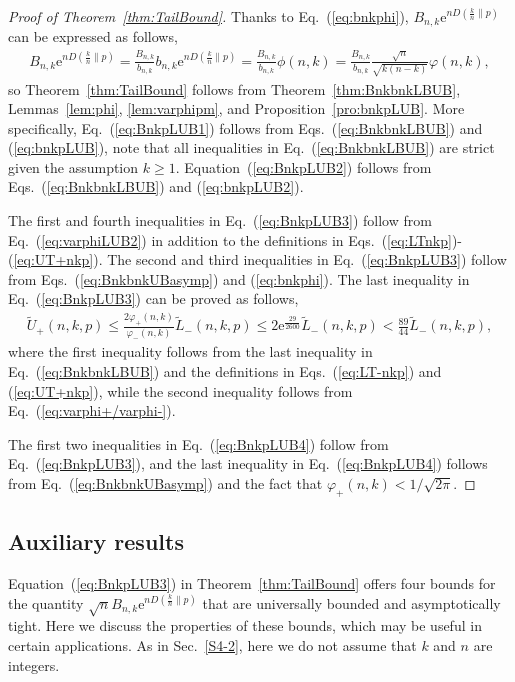 \documentclass[aop]{imsart}
\theoremstyle{plain}
\theoremstyle{remark}
\newcommand{\rme}{\mathrm{e}}
\newcommand{\1}{\operatorname{\uppercase\expandafter{\romannumeral1}}}
\newcommand{\2}{\operatorname{\uppercase\expandafter{\romannumeral2}}}
\newcommand{\3}{\operatorname{\uppercase\expandafter{\romannumeral3}}}
\newcommand{\4}{\operatorname{\uppercase\expandafter{\romannumeral4}}}
\newcommand{\5}{\operatorname{\uppercase\expandafter{\romannumeral5}}}
\newcommand{\6}{\operatorname{\uppercase\expandafter{\romannumeral6}}}
\newcommand{\7}{\operatorname{\uppercase\expandafter{\romannumeral7}}}
\newcommand{\8}{\operatorname{\uppercase\expandafter{\romannumeral8}}}
\newcommand{\9}{\operatorname{\uppercase\expandafter{\romannumeral9}}}
\def\eqref#1{\textup{(\ref{#1})}}
\newcommand{\eref}[1]{Eq.~\textup{(\ref{#1})}}
\newcommand{\Eref}[1]{Equation~\textup{(\ref{#1})}}
\newcommand{\eqsref}[2]{Eqs.~(\ref{#1}) and (\ref{#2})}
\newcommand{\thref}[1]{Theorem~\ref{#1}}
\newcommand{\lsref}[1]{Lemmas~\ref{#1}}
\newcommand{\pref}[1]{Proposition~\ref{#1}}
\newcommand{\sref}[1]{Sec.~\ref{#1}}
\begin{document}
\begin{proof}[Proof of \thref{thm:TailBound}]
Thanks to \eref{eq:bnkphi},
	$B_{n,k}\rme^{nD(\frac{k}{n}\| p)}$ can be expressed as follows,
	\begin{gather}\label{eq:BnkRE}
	B_{n,k}\rme^{nD(\frac{k}{n}\| p)}=\frac{B_{n,k}}{b_{n,k}}b_{n,k}\rme^{nD(\frac{k}{n}\| p)}=\frac{B_{n,k}}{b_{n,k}}\phi(n,k)=\frac{B_{n,k}}{b_{n,k}}\frac{\sqrt{n}}{\sqrt{ k(n-k)}} \varphi(n,k),
	\end{gather}	
so  \thref{thm:TailBound} follows from \thref{thm:BnkbnkLBUB}, 
 \lsref{lem:phi}, \ref{lem:varphipm}, and \pref{pro:bnkpLUB}.	
	More specifically,  \eref{eq:BnkpLUB1} follows from \eqsref{eq:BnkbnkLBUB}{eq:bnkpLUB}, note that all inequalities in \eref{eq:BnkbnkLBUB} are strict given the assumption $k\geq 1$. 
\Eref{eq:BnkpLUB2} follows from \eqsref{eq:BnkbnkLBUB}{eq:bnkpLUB2}.


The first and fourth inequalities in 
\eref{eq:BnkpLUB3} 	follow from 
\eref{eq:varphiLUB2} in addition to the definitions in Eqs.~\eqref{eq:LTnkp}-\eqref{eq:UT+nkp}. 
The second and third inequalities in 
\eref{eq:BnkpLUB3} follow from \eqsref{eq:BnkbnkUBasymp}{eq:bnkphi}. 
The last inequality in \eref{eq:BnkpLUB3} can be proved as follows,
	\begin{align}
	\tilde{U}_+(n,k,p)\leq \frac{2\varphi_+(n,k)}{\varphi_-(n,k)}\tilde{L}_-(n,k,p)\leq 2\rme^{\frac{29}{2600}}\tilde{L}_-(n,k,p)
	<\frac{89}{44}\tilde{L}_-(n,k,p),\label{NZD}
	\end{align}	
	where the first inequality  follows from the last inequality in  \eref{eq:BnkbnkLBUB} and the definitions in \eqsref{eq:LT-nkp}{eq:UT+nkp}, while the second inequality follows from \eref{eq:varphi+/varphi-}.
	
The first two inequalities in \eref{eq:BnkpLUB4} follow from \eref{eq:BnkpLUB3}, and the last inequality in \eref{eq:BnkpLUB4} follows from
\eref{eq:BnkbnkUBasymp} and the fact that $\varphi_+(n,k)<1/\sqrt{2\pi}$. 
\end{proof}


\subsection{Auxiliary results}
\Eref{eq:BnkpLUB3} in \thref{thm:TailBound} offers four bounds  for the quantity $\sqrt{n} B_{n,k} \rme^{nD(\frac{k}{n}\| p)}$
that are universally bounded and asymptotically tight. Here we discuss the properties of these bounds, which may be useful in certain applications. As in \sref{S4-2},
here we do not assume that $k$ and $n$ are integers. 
\end{document}
